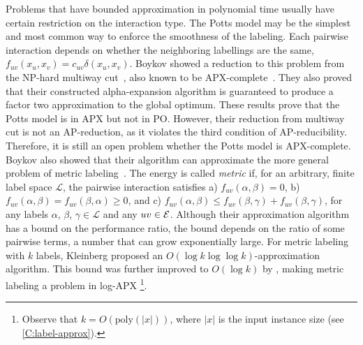 Problems that have bounded approximation in polynomial time usually have certain restriction on the interaction type. The Potts model may be the simplest and most common way to enforce the smoothness of the labeling. Each pairwise interaction depends on whether the neighboring labellings are the same, \ie $f_{uv}(x_u,x_v) = c_{uv}\delta(x_u, x_v)$.  Boykov \etal showed a reduction to this problem from the NP-hard multiway cut~\cite{boykov2001approximate}, also known to be APX-complete~\cite{ausiello1999complexity, dahlhaus1994complexity}. They also proved that their constructed alpha-expansion algorithm is guaranteed to produce a factor two approximation to the global optimum. These results prove that the Potts model is in APX but not in PO. However, their reduction from multiway cut is not an AP-reduction, as it violates the third condition of AP-reducibility. Therefore, it is still an open problem whether the Potts model is APX-complete.
Boykov \etal also showed that their algorithm can approximate the more general problem of metric labeling~\cite{boykov2001approximate}. The energy is called {\em metric} if, for an arbitrary, finite label space $\mathcal{L}$, the pairwise interaction satisfies a) $ f_{uv}(\alpha, \beta) = 0$, b) $f_{uv}(\alpha, \beta) = f_{uv}(\beta, \alpha) \geq 0$, and c) $f_{uv}(\alpha, \beta) \leq f_{uv}(\beta, \gamma) + f_{uv}(\beta, \gamma)$,
for any labels $\alpha$, $\beta$, $\gamma \in \mathcal{L}$ and any $uv \in \mathcal{E}$. Although their approximation algorithm has a bound on the performance ratio, the bound depends on the ratio of some pairwise terms, a number that can grow exponentially large. For metric labeling with $k$ labels, Kleinberg \etal proposed an $O(\log k \log \log k)$-approximation algorithm. This bound was further improved to $O(\log k)$ by \citet{Chekuri:2005:LPF}, making metric labeling a problem in log-APX \footnote{Observe that $k = O(\text{poly}(|x|))$, where $|x|$ is the input instance size (see \cref{C:label-approx}). }.

